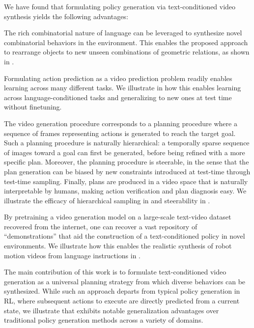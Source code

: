 We have found that formulating policy generation via text-conditioned video synthesis yields the following advantages:
    
  The rich combinatorial nature of language can be leveraged to synthesize novel combinatorial behaviors in the environment. This enables the proposed approach to rearrange objects to new unseen combinations of geometric relations, as shown in .

 Formulating action prediction as a video prediction problem readily enables learning across many different tasks. We illustrate in  how this enables learning across language-conditioned tasks and generalizing to new ones at test time  without finetuning.


 The video generation procedure corresponds to a planning procedure where a sequence of frames representing actions is generated to reach the target goal. 
Such a planning procedure is naturally hierarchical: a temporally sparse sequence of images toward a goal can first be generated, before being refined with a more specific plan. %
Moreover, the planning procedure is %
steerable, in the sense that the plan generation can be biased by new constraints introduced
at test-time through test-time sampling. 
Finally, plans are produced in a video space that is naturally interpretable by humans, making action verification and plan diagnosis easy. 
We illustrate the efficacy of hierarchical sampling in  and steerability in .

 By pretraining a video generation model on a large-scale text-video dataset recovered from the internet, one can recover a vast repository of ``demonstrations'' that aid the construction of a text-conditioned policy in novel environments. We illustrate how this enables the realistic synthesis of robot motion videos from language instructions in .

The main contribution of this work is to formulate text-conditioned video generation as a universal planning strategy from which diverse behaviors can be synthesized. While such an approach departs from typical policy generation in RL, where subsequent actions to execute are directly predicted from a current state, we illustrate that \model exhibits notable generalization advantages over traditional policy generation %
methods
across a variety of  domains.

